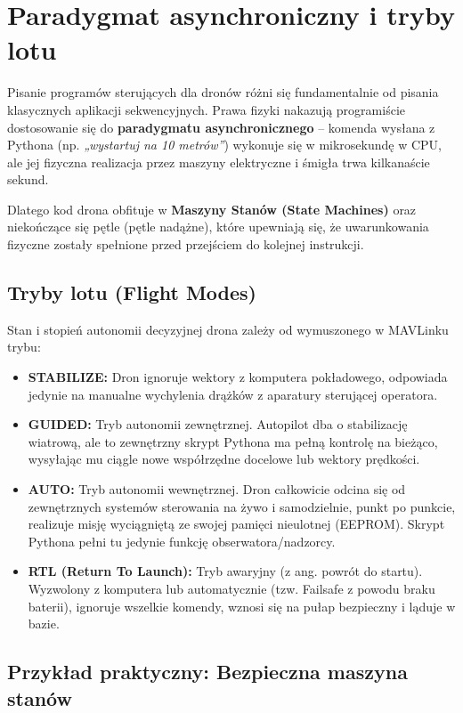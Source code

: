 \section{Paradygmat asynchroniczny i tryby lotu}

Pisanie programów sterujących dla dronów różni się fundamentalnie od pisania klasycznych aplikacji sekwencyjnych. Prawa fizyki nakazują programiście dostosowanie się do \textbf{paradygmatu asynchronicznego} -- komenda wysłana z Pythona (np. \textit{„wystartuj na 10 metrów”}) wykonuje się w mikrosekundę w CPU, ale jej fizyczna realizacja przez maszyny elektryczne i śmigła trwa kilkanaście sekund.

Dlatego kod drona obfituje w \textbf{Maszyny Stanów (State Machines)} oraz niekończące się pętle (pętle nadążne), które upewniają się, że uwarunkowania fizyczne zostały spełnione przed przejściem do kolejnej instrukcji.

\subsection{Tryby lotu (Flight Modes)}
Stan i stopień autonomii decyzyjnej drona zależy od wymuszonego w MAVLinku trybu:
\begin{itemize}
    \item \textbf{STABILIZE:} Dron ignoruje wektory z komputera pokładowego, odpowiada jedynie na manualne wychylenia drążków z aparatury sterującej operatora.
    \item \textbf{GUIDED:} Tryb autonomii zewnętrznej. Autopilot dba o stabilizację wiatrową, ale to zewnętrzny skrypt Pythona ma pełną kontrolę na bieżąco, wysyłając mu ciągle nowe współrzędne docelowe lub wektory prędkości.
    \item \textbf{AUTO:} Tryb autonomii wewnętrznej. Dron całkowicie odcina się od zewnętrznych systemów sterowania na żywo i samodzielnie, punkt po punkcie, realizuje misję wyciągniętą ze swojej pamięci nieulotnej (EEPROM). Skrypt Pythona pełni tu jedynie funkcję obserwatora/nadzorcy.
    \item \textbf{RTL (Return To Launch):} Tryb awaryjny (z ang. powrót do startu). Wyzwolony z komputera lub automatycznie (tzw. Failsafe z powodu braku baterii), ignoruje wszelkie komendy, wznosi się na pułap bezpieczny i ląduje w bazie.
\end{itemize}

\subsection{Przykład praktyczny: Bezpieczna maszyna stanów}

